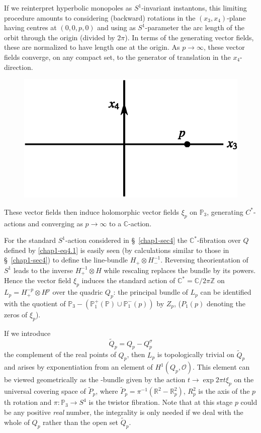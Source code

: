 If we reinterpret hyperbolic monopoles as $S^{1}$-invariant
instantons, this limiting procedure amounts to considering (backward)
rotations in the $(x_{3},x_{4})$-plane having centres at $(0,0,p,0)$
and using as $S^{1}$-parameter the arc length of the orbit through the
origin (divided by $2\pi$). In terms of the generating vector fields,
these are normalized to have length one at the origin. As $p\to
\infty$, these vector fields converge, on any compact set, to the
generator of translation in the $x_{4}$-direction.
\begin{figure}[H]
\centering
\includegraphics{figures/chap1-fig2.eps}
\end{figure}
These vector fields then induce holomorphic vector fields $\xi_{p}$ on
$\mathbb{P}_{3}$, generating $C^{*}$-actions and converging as $p\to
\infty$ to a $\mathbb{C}$-action.

For the standard $S^{1}$-action considered in \S\ \ref{chap1-sec4} the
$\mathbb{C}^{*}$-fibration over $Q$ defined by \eqref{chap1-eq4.1} is
easily seen (by calculations similar to those in \S\ \ref{chap1-sec4})
to define the line-bundle $H_{+}\otimes H^{-1}_{-}$. Reversing
the\pageoriginale orientation of $S^{1}$ leads to the inverse
$H^{-1}_{+}\otimes H$ while rescaling replaces the bundle by its
powers. Hence the vector field $\xi_{p}$ induces the standard action
of $\mathbb{C}^{*}=\mathbb{C}/2\pi\mathbb{Z}$ on
$L_{p}=H^{-p}_{+}\otimes H^{p}$ over the quadric $Q_{p}$: the
principal bundle of $L_{p}$ can be identified with the quotient of
$\mathbb{P}_{3}-(\mathbb{P}^{+}_{1}(\mathbb{P})\cup
\mathbb{P}^{-}_{1}(p))$ by $Z_{p}$, ($P_{1}(p)$ denoting the zeros of
$\xi_{p}$). 

If we introduce
\begin{equation}
\widetilde{Q}_{p}=Q_{p}-Q_{p}^{\sigma}\label{chap1-eq5.3}
\end{equation}
the complement of the real points of $Q_{p}$, then $L_{p}$ is
topologically trivial on $\widetilde{Q}_{p}$ and arises by
exponentiation from an element of $H^{1}(Q_{p},\mathscr{O})$. This
element can be viewed geometrically as the -bundle given by the action
$t\to \exp 2\pi t\xi_{p}$ on the universal covering space of
$\widetilde{P}_{p}$, where
$\widetilde{P}_{p}=\pi^{-1}(\mathbb{R}^{2}-\mathbb{R}^{2}_{p})$,
$R^{2}_{p}$ is the axis of the $p$th rotation and
$\pi:\mathbb{P}_{3}\to S^{4}$ is the twistor fibration. Note that at
this stage $p$ could be any positive {\em real} number, the
integrality is only needed if we deal with the whole of $Q_{p}$ rather
than the open set $\widetilde{Q}_{p}$.

